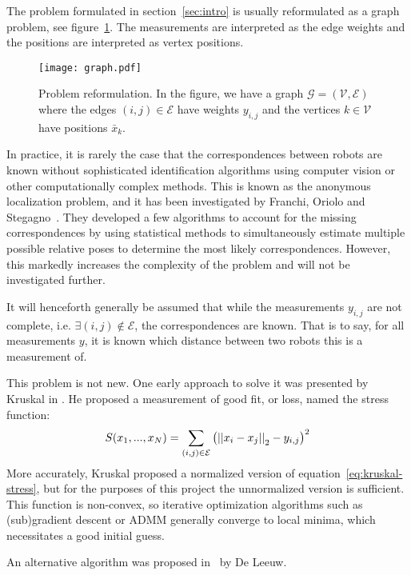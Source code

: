 The problem formulated in section~\ref{sec:intro} is usually reformulated as a graph problem, see figure~\ref{fig:problem-graph}. The measurements are interpreted as the edge weights and the positions are interpreted as vertex positions. 
\begin{figure}[ht]
    \centering
    \texttt{[image: graph.pdf]}
    \caption{Problem reformulation. In the figure, we have a graph $\mathcal{G}=(\mathcal{V}, \mathcal{E})$ where the edges $(i, j) \in \mathcal{E}$ have weights $y_{i,j}$ and the vertices $k \in \mathcal{V}$ have positions $\bar{x}_k$.}
    \label{fig:problem-graph}
\end{figure}

In practice, it is rarely the case that the correspondences between robots are known without sophisticated identification algorithms using computer vision or other computationally complex methods. This is known as the anonymous localization problem, and it has been investigated by Franchi, Oriolo and Stegagno~\cite{anonymous_loc_1,anonymous_loc_2,anonymous_loc_3}. They developed a few algorithms to account for the missing correspondences by using statistical methods to simultaneously estimate multiple possible relative poses to determine the most likely correspondences. However, this markedly increases the complexity of the problem and will not be investigated further.

It will henceforth generally be assumed that while the measurements $y_{i,j}$ are not complete, i.e. $\exists (i, j) \notin \mathcal{E}$, the correspondences are known. That is to say, for all measurements $y$, it is known which distance between two robots this is a measurement of. 



This problem is not new. One early approach to solve it was presented by Kruskal in \cite{Kruskal1964}. He proposed a measurement of good fit, or loss, named the stress function: 
\begin{align}
    \label{eq:kruskal-stress}
    S(x_1, ..., x_N) = \sum_{(i,j) \in \mathcal{E}} \left(
        \norm{x_i - x_j}_2 - y_{i, j}
    \right)^2
\end{align}
More accurately, Kruskal proposed a normalized version of equation~\ref{eq:kruskal-stress}, but for the purposes of this project the unnormalized version is sufficient. This function is non-convex, so iterative optimization algorithms such as (sub)gradient descent or ADMM generally converge to local minima, which necessitates a good initial guess. 

An alternative algorithm was proposed in~\cite{MDS_proposal} by De Leeuw. 